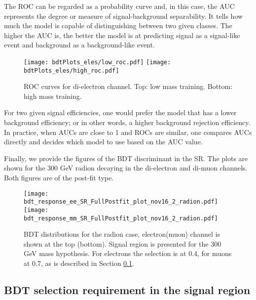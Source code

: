 The ROC can be regarded as a probability curve and, in this case, the AUC represents the degree or measure of signal-background separability. It tells how much the model is capable of distinguishing between two given classes. The higher the AUC is, the better the model is at predicting signal as a signal-like event and background as a background-like event.

\begin{figure}[H]
\begin{center}
\texttt{[image: bdtPlots\_eles/low\_roc.pdf]}
\texttt{[image: bdtPlots\_eles/high\_roc.pdf]}
\caption[ROC curves for di-electron channel.]{ ROC curves for di-electron channel. Top: low mass training. Bottom: high mass training. }
\label{fig:ele_ROCs}
\end{center}
\end{figure}

For two given signal efficiencies, one would prefer the model that has a lower background efficiency; or in other words, a higher background rejection efficiency. In practice, when AUCs are close to 1 and ROCs are similar, one compares AUCs directly and decides which model to use based on the AUC value. 

Finally, we provide the figures of the BDT discriminant in the SR. The plots are shown for the 300 GeV radion decaying in the di-electron and di-muon channels. Both figures are of the post-fit type.

\begin{figure}[H]
\begin{center}
\texttt{[image: bdt\_response\_ee\_SR\_FullPostfit\_plot\_nov16\_2\_radion.pdf]}\\
\texttt{[image: bdt\_response\_mm\_SR\_FullPostfit\_plot\_nov16\_2\_radion.pdf]}\\
\caption[BDT distributions for the radion case.]{ BDT distributions for the radion case, electron(muon) channel is shown at the top (bottom). Signal region is presented for the 300 GeV mass hypothesis. For electrons the selection is at 0.4, for muons at 0.7, as is described in Section \ref{BDT_selection_in_SR}.}
\label{fig:BDTs}
\end{center}
\end{figure}

\subsection{BDT selection requirement in the signal region}
\label{BDT_selection_in_SR}

